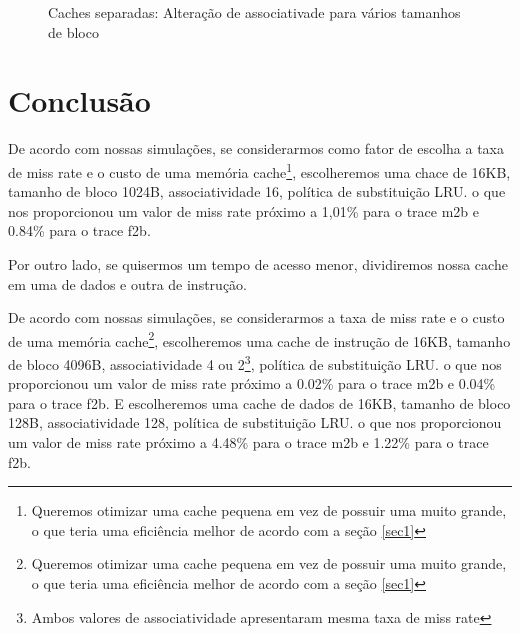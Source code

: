 \documentclass[12pt,a4paper]{article}
\begin{document}
\begin{figure}[h!]
\caption{Caches separadas:  Alteração de associativade para vários tamanhos de bloco}
\end{figure}

\section{Conclusão}
De acordo com nossas simulações, se considerarmos como fator de
escolha a taxa de miss rate e o custo de uma memória
cache\footnote{Queremos otimizar uma cache pequena em vez de possuir
  uma muito grande, o que teria uma eficiência melhor de acordo com a
seção \ref{sec1}}, escolheremos uma chace de 16KB, tamanho
de bloco 1024B, associatividade 16, política de substituição LRU.
o que nos proporcionou um valor de miss rate próximo a 1,01\% para o
trace m2b e 0.84\% para o trace f2b.

Por outro lado, se quisermos um tempo de acesso menor, dividiremos nossa cache
em uma de dados e outra de instrução.

De acordo com nossas simulações, se considerarmos a taxa de miss rate e o custo de uma memória
cache\footnote{Queremos otimizar uma cache pequena em vez de possuir
  uma muito grande, o que teria uma eficiência melhor de acordo com a
seção \ref{sec1}}, escolheremos uma cache de instrução de 16KB, tamanho
de bloco 4096B, associatividade 4 ou 2\footnote{Ambos valores de
  associatividade apresentaram mesma taxa de miss rate}, política de substituição LRU.
o que nos proporcionou um valor de miss rate próximo a 0.02\% para o
trace m2b e 0.04\% para o trace f2b.
E  escolheremos uma cache de dados de 16KB, tamanho
de bloco 128B, associatividade 128, política de substituição LRU.
o que nos proporcionou um valor de miss rate próximo a 4.48\% para o
trace m2b e 1.22\% para o trace f2b.
\end{document}
